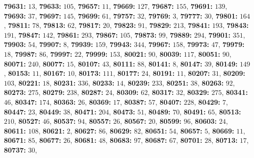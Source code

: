 \textsf{\bfseries 79631:} $13$, \textsf{\bfseries 79633:} $105$, \textsf{\bfseries 79657:} $11$, \textsf{\bfseries 79669:} $127$, \textsf{\bfseries 79687:} $155$, \textsf{\bfseries 79691:} $139$, \textsf{\bfseries 79693:} $37$, \textsf{\bfseries 79697:} $145$, \textsf{\bfseries 79699:} $61$, \textsf{\bfseries 79757:} $32$, \textsf{\bfseries 79769:} $3$, \textsf{\bfseries 79777:} $30$, \textsf{\bfseries 79801:} $164$, \textsf{\bfseries 79811:} $78$, \textsf{\bfseries 79813:} $62$, \textsf{\bfseries 79817:} $20$, \textsf{\bfseries 79823:} $91$, \textsf{\bfseries 79829:} $213$, \textsf{\bfseries 79841:} $193$, \textsf{\bfseries 79843:} $191$, \textsf{\bfseries 79847:} $142$, \textsf{\bfseries 79861:} $293$, \textsf{\bfseries 79867:} $105$, \textsf{\bfseries 79873:} $99$, \textsf{\bfseries 79889:} $294$, \textsf{\bfseries 79901:} $351$, \textsf{\bfseries 79903:} $54$, \textsf{\bfseries 79907:} $8$, \textsf{\bfseries 79939:} $159$, \textsf{\bfseries 79943:} $344$, \textsf{\bfseries 79967:} $158$, \textsf{\bfseries 79973:} $47$, \textsf{\bfseries 79979:} $18$, \textsf{\bfseries 79987:} $86$, \textsf{\bfseries 79997:} $22$, \textsf{\bfseries 79999:} $153$, \textsf{\bfseries 80021:} $90$, \textsf{\bfseries 80039:} $117$, \textsf{\bfseries 80051:} $90$, \textsf{\bfseries 80071:} $240$, \textsf{\bfseries 80077:} $15$, \textsf{\bfseries 80107:} $43$, \textsf{\bfseries 80111:} $88$, \textsf{\bfseries 80141:} $8$, \textsf{\bfseries 80147:} $39$, \textsf{\bfseries 80149:} $149$, \textsf{\bfseries 80153:} $11$, \textsf{\bfseries 80167:} $10$, \textsf{\bfseries 80173:} $111$, \textsf{\bfseries 80177:} $24$, \textsf{\bfseries 80191:} $11$, \textsf{\bfseries 80207:} $31$, \textsf{\bfseries 80209:} $103$, \textsf{\bfseries 80221:} $18$, \textsf{\bfseries 80231:} $336$, \textsf{\bfseries 80233:} $14$, \textsf{\bfseries 80239:} $233$, \textsf{\bfseries 80251:} $38$, \textsf{\bfseries 80263:} $92$, \textsf{\bfseries 80273:} $275$, \textsf{\bfseries 80279:} $238$, \textsf{\bfseries 80287:} $24$, \textsf{\bfseries 80309:} $62$, \textsf{\bfseries 80317:} $32$, \textsf{\bfseries 80329:} $275$, \textsf{\bfseries 80341:} $46$, \textsf{\bfseries 80347:} $174$, \textsf{\bfseries 80363:} $26$, \textsf{\bfseries 80369:} $17$, \textsf{\bfseries 80387:} $57$, \textsf{\bfseries 80407:} $228$, \textsf{\bfseries 80429:} $7$, \textsf{\bfseries 80447:} $23$, \textsf{\bfseries 80449:} $38$, \textsf{\bfseries 80471:} $204$, \textsf{\bfseries 80473:} $51$, \textsf{\bfseries 80489:} $70$, \textsf{\bfseries 80491:} $65$, \textsf{\bfseries 80513:} $210$, \textsf{\bfseries 80527:} $46$, \textsf{\bfseries 80537:} $94$, \textsf{\bfseries 80557:} $26$, \textsf{\bfseries 80567:} $20$, \textsf{\bfseries 80599:} $96$, \textsf{\bfseries 80603:} $24$, \textsf{\bfseries 80611:} $108$, \textsf{\bfseries 80621:} $2$, \textsf{\bfseries 80627:} $86$, \textsf{\bfseries 80629:} $82$, \textsf{\bfseries 80651:} $54$, \textsf{\bfseries 80657:} $5$, \textsf{\bfseries 80669:} $11$, \textsf{\bfseries 80671:} $85$, \textsf{\bfseries 80677:} $26$, \textsf{\bfseries 80681:} $48$, \textsf{\bfseries 80683:} $97$, \textsf{\bfseries 80687:} $67$, \textsf{\bfseries 80701:} $28$, \textsf{\bfseries 80713:} $17$, \textsf{\bfseries 80737:} $30$, 
